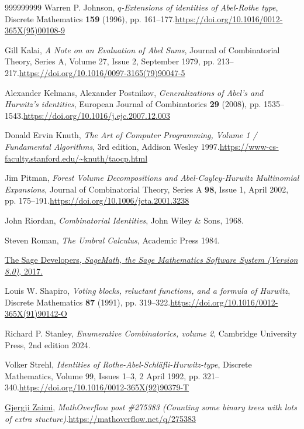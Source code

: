 \documentclass[numbers=enddot,12pt,final,onecolumn,notitlepage]{scrartcl}%
\theoremstyle{definition}
\begin{document}
\begin{thebibliography}{999999999}
Warren P. Johnson, $q$\textit{-Extensions of
identities of Abel-Rothe type}, Discrete Mathematics \textbf{159} (1996), pp.
161--177.\newline\url{https://doi.org/10.1016/0012-365X(95)00108-9}

Gill Kalai, \textit{A Note on an Evaluation of Abel
Sums}, Journal of Combinatorial Theory, Series A, Volume 27, Issue 2,
September 1979, pp. 213--217.\newline\url{https://doi.org/10.1016/0097-3165(79)90047-5}

Alexander Kelmans, Alexander Postnikov,
\textit{Generalizations of Abel's and Hurwitz's identities}, European Journal
of Combinatorics \textbf{29} (2008), pp. 1535--1543.\newline\url{https://doi.org/10.1016/j.ejc.2007.12.003}

Donald Ervin Knuth, \textit{The Art of Computer
Programming, Volume 1 / Fundamental Algorithms}, 3rd edition, Addison Wesley
1997.\newline\url{https://www-cs-faculty.stanford.edu/~knuth/taocp.html}

Jim Pitman, \textit{Forest Volume Decompositions
and Abel-Cayley-Hurwitz Multinomial Expansions}, Journal of Combinatorial
Theory, Series A \textbf{98}, Issue 1, April 2002, pp. 175--191.\newline\url{https://doi.org/10.1006/jcta.2001.3238}

John Riordan, \textit{Combinatorial Identities},
John Wiley \& Sons, 1968.

Steven Roman, \textit{The Umbral Calculus}, Academic
Press 1984.

\href{http://www.sagemath.org}{The Sage
Developers, \textit{SageMath, the Sage Mathematics Software System (Version
8.0)}, 2017.}

Louis W. Shapiro, \textit{Voting blocks, reluctant
functions, and a formula of Hurwitz}, Discrete Mathematics \textbf{87} (1991),
pp. 319--322.\newline\url{https://doi.org/10.1016/0012-365X(91)90142-O}

Richard P. Stanley, \textit{Enumerative
Combinatorics, volume 2}, Cambridge University Press, 2nd edition 2024.

Volker Strehl, \textit{Identities of
Rothe-Abel-Schl\"{a}fli-Hurwitz-type}, Discrete Mathematics, Volume 99, Issues
1--3, 2 April 1992, pp. 321--340.\newline\url{https://doi.org/10.1016/0012-365X(92)90379-T}

%
\href{https://mathoverflow.net/users/2384/gjergji-zaimi}{Gjergji Zaimi},
\textit{MathOverflow post \#275383 (Counting some binary trees with lots of
extra stucture)}.\newline\url{https://mathoverflow.net/q/275383}
\end{thebibliography}
\end{document}
